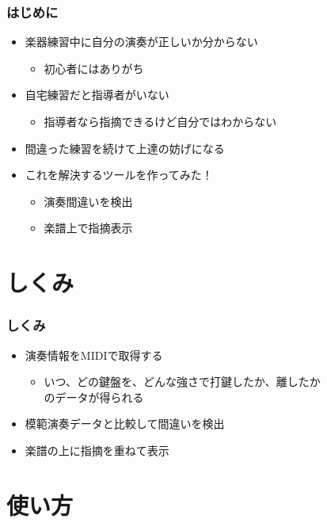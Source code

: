 \begin{frame}\frametitle{はじめに}
  \begin{itemize}
  \item 楽器練習中に自分の演奏が正しいか分からない
    \begin{itemize}
    \item 初心者にはありがち
    \end{itemize}
  \item 自宅練習だと指導者がいない
    \begin{itemize}
    \item 指導者なら指摘できるけど自分ではわからない
    \end{itemize}
  \item 間違った練習を続けて上達の妨げになる

    \vspace{1\zh}
  \item これを解決するツールを作ってみた！
    \begin{itemize}
    \item 演奏間違いを検出
    \item 楽譜上で指摘表示
    \end{itemize}
  \end{itemize}
\end{frame}

\section{しくみ}

\begin{frame}\frametitle{しくみ}
  \begin{itemize}
  \item 演奏情報をMIDIで取得する
    \begin{itemize}
    \item いつ、どの鍵盤を、どんな強さで打鍵したか、離したか \\
      のデータが得られる
    \end{itemize}
  \item 模範演奏データと比較して間違いを検出
  \item 楽譜の上に指摘を重ねて表示
  \end{itemize}
\end{frame}

\section{使い方}

